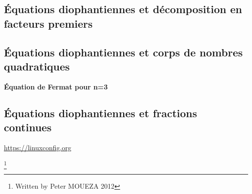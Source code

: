 \documentclass{article}
\begin{document}


\subsection{Équations diophantiennes et décomposition en facteurs premiers}

\subsection{Équations diophantiennes et corps de nombres quadratiques}
\textbf{Équation de Fermat pour n=3}


\subsection{Équations diophantiennes et fractions continues}





\url{https://linuxconfig.org}

\footnote{Written by Peter MOUEZA 2012}
\end{document}
